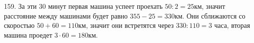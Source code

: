 159. За эти 30 минут первая машина успеет проехать $50:2=25$км, значит расстояние между машинами будет равно $355-25=330$км. Они сближаются со скоростью $50+60=110$км, значит они встретятся через $330:110=3$ часа, вторая машина проедет $3\cdot60=180$км.\\
